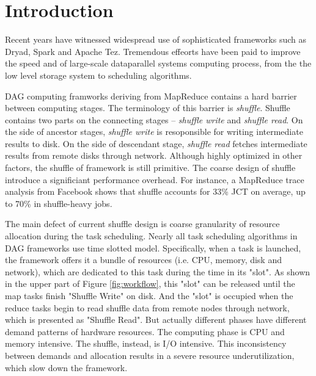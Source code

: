 \section{Introduction}

Recent years have witnessed widespread use of sophisticated frameworks such as Dryad\cite{dryad}, Spark\cite{spark} and Apache Tez\cite{tez}.
Tremendous effeorts have been paid to improve the speed and of large-scale dataparallel systems computing process, from the the low level storage system to scheduling algorithms.

DAG computing framworks deriving from MapReduce\cite{mapreduce} contains a hard barrier between computing stages. The terminology of this barrier is \textit{shuffle}. Shuffle contains two parts on the connecting stages -- \textit{shuffle write} and \textit{shuffle read}. On the side of ancestor stages, \textit{shuffle write} is resoponsible for writing intermediate results to disk. On the side of descendant stage, \textit{shuffle read} fetches intermediate results from remote disks through network. Although highly optimized in other factors, the shuffle of framework is still primitive.  The coarse design of shuffle introduce a significiant performance overhead.
For instance, a MapReduce trace analysis from Facebook shows that shuffle accounts for 33\% JCT on average, up to 70\% in shuffle-heavy jobs\cite{managing}.

The main defect of current shuffle design is coarse granularity of resource allocation during the task scheduling. 
Nearly all task scheduling algorithms in DAG frameworks use time slotted model. Specifically, when a task is launched, the framework offers it a bundle of resources (i.e. CPU, memory, disk and network), which are dedicated to this task during the time in its "slot". As shown in the upper part of Figure \ref{fig:workflow}, this "slot" can be released until the map tasks finish "Shuffle Write" on disk. And the "slot" is occupied when the reduce tasks begin to read shuffle data from remote nodes through network, which is presented as "Shuffle Read". But actually different phases have different demand patterns of hardware resources. The computing phase is CPU and memory intensive. The shuffle, instead, is I/O intensive. This inconsistency between demands and allocation results in a severe resource underutilization, which slow down the framework.

